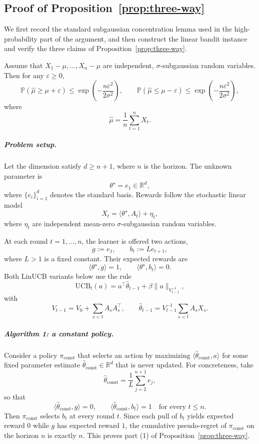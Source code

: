 \documentclass[anon]{alt2027} %
\begin{document}
\subsection{Proof of Proposition~\ref{prop:three-way}}
\label{app:proof-three-way}

We first record the standard subgaussian concentration lemma used in the
high-probability part of the argument, and then construct the linear bandit
instance and verify the three claims of Proposition~\ref{prop:three-way}.

\begin{lemma}
\label{lem:subgaussian}
Assume that $X_1-\mu,\dots,X_n-\mu$ are independent, $\sigma$-subgaussian random variables. Then for any $\varepsilon \ge 0$,
\[
\mathbb{P}\!\left(\hat{\mu} \ge \mu+\varepsilon\right)
\le
\exp\!\left(-\frac{n\varepsilon^2}{2\sigma^2}\right),
\qquad
\mathbb{P}\!\left(\hat{\mu} \le \mu-\varepsilon\right)
\le
\exp\!\left(-\frac{n\varepsilon^2}{2\sigma^2}\right),
\]
where
\[
\hat{\mu}=\frac{1}{n}\sum_{t=1}^n X_t.
\]
\end{lemma}

\subparagraph{Problem setup.}
Let the dimension satisfy $d \ge n+1$, where $n$ is the horizon. The unknown parameter is
\[
\theta^\star = e_1 \in \mathbb{R}^d,
\]
where $\{e_i\}_{i=1}^d$ denotes the standard basis. Rewards follow the stochastic linear model
\[
X_t = \langle \theta^\star, A_t \rangle + \eta_t,
\]
where $\eta_t$ are independent mean-zero $\sigma$-subgaussian random variables.

At each round $t=1,\dots,n$, the learner is offered two actions,
\[
g:=e_1,
\qquad
b_t:=L e_{t+1},
\]
where $L>1$ is a fixed constant. Their expected rewards are
\[
\langle \theta^\star,g\rangle = 1,
\qquad
\langle \theta^\star,b_t\rangle = 0.
\]
Both LinUCB variants below use the rule
\[
\mathrm{UCB}_t(a)
=
a^\top \hat{\theta}_{t-1}
+
\beta \|a\|_{V_{t-1}^{-1}},
\]
with
\[
V_{t-1}=V_0+\sum_{s<t} A_sA_s^\top,
\qquad
\hat{\theta}_{t-1}
=
V_{t-1}^{-1}\sum_{s<t} A_s X_s.
\]

\subparagraph{Algorithm 1: a constant policy.}
Consider a policy $\pi_{\mathrm{const}}$ that selects an action by maximizing $\langle \hat{\theta}_{\mathrm{const}}, a\rangle$ for some fixed parameter estimate $\hat{\theta}_{\mathrm{const}}\in\mathbb{R}^d$ that is never updated. For concreteness, take
\[
\hat{\theta}_{\mathrm{const}}
=
\frac{1}{L}\sum_{j=2}^{n+1} e_j,
\]
so that
\[
\langle \hat{\theta}_{\mathrm{const}},g\rangle = 0,
\qquad
\langle \hat{\theta}_{\mathrm{const}},b_t\rangle = 1
\quad\text{for every } t\le n.
\]
Then $\pi_{\mathrm{const}}$ selects $b_t$ at every round $t$. Since each pull of $b_t$ yields expected reward $0$ while $g$ has expected reward $1$, the cumulative pseudo-regret of $\pi_{\mathrm{const}}$ on the horizon $n$ is exactly $n$. This proves part (1) of Proposition~\ref{prop:three-way}.
\end{document}

